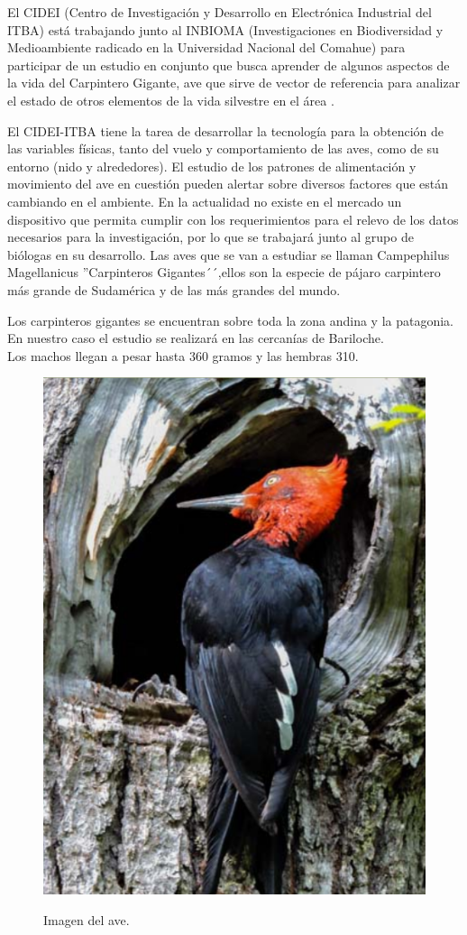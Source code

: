 El CIDEI (Centro de Investigación y Desarrollo en Electrónica Industrial del ITBA) está trabajando junto al INBIOMA (Investigaciones en Biodiversidad y Medioambiente radicado en la Universidad Nacional del Comahue) para participar de un estudio en conjunto que busca aprender de algunos aspectos de la vida del Carpintero Gigante, ave que sirve de vector de referencia para analizar el estado de otros elementos de la vida silvestre en el área \cite{ref:PaperValeriaOjeda}.

El CIDEI-ITBA tiene la tarea de desarrollar la tecnología para la obtención de las variables físicas, tanto del vuelo y comportamiento de las aves, como de su entorno (nido y alrededores). El estudio de los patrones de alimentación y movimiento del ave en cuestión pueden alertar sobre diversos factores que están cambiando en el ambiente. En la actualidad no existe en el mercado un dispositivo que permita cumplir con los requerimientos para el relevo de los datos necesarios para la investigación, por lo que se trabajará junto al grupo de biólogas en su desarrollo.
Las aves que se van a estudiar se llaman Campephilus Magellanicus ''Carpinteros Gigantes´´,ellos son la especie de pájaro carpintero más grande de Sudamérica y de las más grandes del mundo.

Los carpinteros gigantes se encuentran sobre toda la zona andina y la patagonia. En nuestro caso el estudio se realizará en las cercanías de Bariloche.
\\
Los machos llegan a pesar hasta 360 gramos y las hembras 310.\\
\begin{figure}[H]
	\centering
	\includegraphics[width=0.4\linewidth]{ImagenesIntroduccion/pajaro}
	\label{fig:pajaro}
	\caption{Imagen del ave.}
\end{figure}


